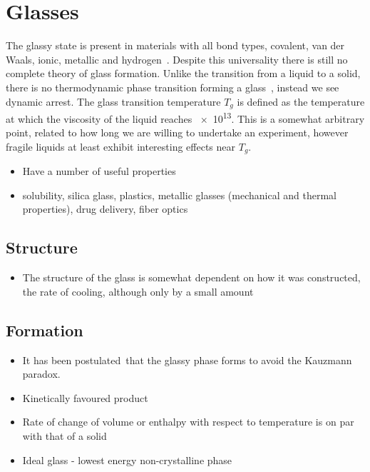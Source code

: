 {\begin{itemize}
\end{itemize}


\section{Glasses}

The glassy state is present in materials with all bond types, covalent, van der Waals, ionic, metallic and hydrogen~\cite{turnbull:69}. Despite this universality there is still no complete theory of glass formation. Unlike the transition from a liquid to a solid, there is no thermodynamic phase transition forming a glass~\cite{santen:00}, instead we see dynamic arrest. The glass transition temperature $T_g$ is defined as the temperature at which the viscosity of the liquid reaches \SI{e13}{\poise}. This is a somewhat arbitrary point, related to how long we are willing to undertake an experiment, however fragile liquids at least exhibit interesting effects near $T_g$.

\begin{itemize}

    \item Have a number of useful properties~\cite{greer:07}
    \item solubility, silica glass, plastics, metallic glasses (mechanical and thermal properties), drug delivery, fiber optics
\end{itemize}

\subsection{Structure}
\begin{itemize}

    \item The structure of the glass is somewhat dependent on how it was constructed, the rate of cooling, although only by a small amount

\end{itemize}

\subsection{Formation}

\begin{itemize}
    \item It has been postulated~\tocite that the glassy phase forms to avoid the Kauzmann paradox. 

    \item Kinetically favoured product
    \item Rate of change of volume or enthalpy with respect to temperature is on par with that of a solid
    \item Ideal glass - lowest energy non-crystalline phase


\end{itemize}}
